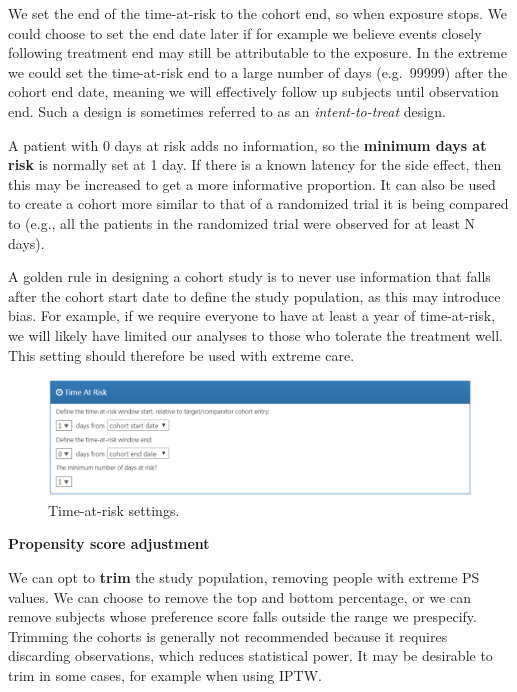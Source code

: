 \documentclass[11pt]{book}
\let\BeginKnitrBlock\begin \let\EndKnitrBlock\end
\begin{document}
We set the end of the time-at-risk to the cohort end, so when exposure
stops. We could choose to set the end date later if for example we
believe events closely following treatment end may still be attributable
to the exposure. In the extreme we could set the time-at-risk end to a
large number of days (e.g.~99999) after the cohort end date, meaning we
will effectively follow up subjects until observation end. Such a design
is sometimes referred to as an \emph{intent-to-treat} design.

A patient with 0 days at risk adds no information, so the
\textbf{minimum days at risk} is normally set at 1 day. If there is a
known latency for the side effect, then this may be increased to get a
more informative proportion. It can also be used to create a cohort more
similar to that of a randomized trial it is being compared to (e.g., all
the patients in the randomized trial were observed for at least N days).

\BeginKnitrBlock{rmdimportant}
A golden rule in designing a cohort study is to never use information
that falls after the cohort start date to define the study population,
as this may introduce bias. For example, if we require everyone to have
at least a year of time-at-risk, we will likely have limited our
analyses to those who tolerate the treatment well. This setting should
therefore be used with extreme care.
\EndKnitrBlock{rmdimportant}

\begin{figure}

{\centering \includegraphics[width=1\linewidth]{images/PopulationLevelEstimation/timeAtRisk} 

}

\caption{Time-at-risk settings.}\label{fig:timeAtRisk}
\end{figure}

\textbf{Propensity score adjustment}

We can opt to \textbf{trim} the study population, removing people with
extreme PS values. We can choose to remove the top and bottom
percentage, or we can remove subjects whose preference score
\citep{walker_2013} falls outside the range we prespecify. Trimming the
cohorts is generally not recommended because it requires discarding
observations, which reduces statistical power. It may be desirable to
trim in some cases, for example when using IPTW.
\end{document}

